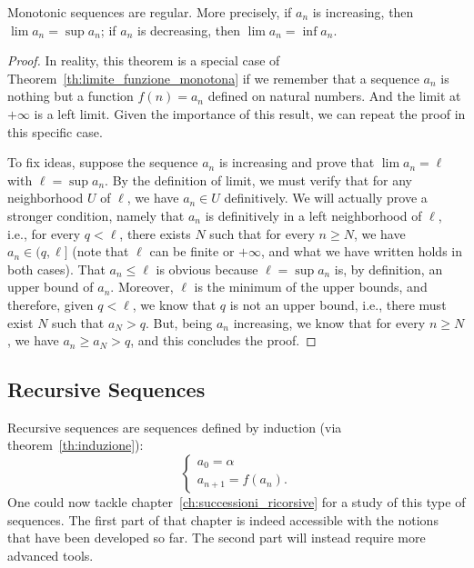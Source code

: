 \begin{theorem}
\label{th:limite_successione_monotona}%
Monotonic sequences are regular.
More precisely, if $a_n$ is increasing, then $\lim a_n = \sup a_n$; 
if $a_n$ is decreasing, then $\lim a_n = \inf a_n$.
\end{theorem}
\begin{proof}
In reality, this theorem is a special case of 
Theorem~\ref{th:limite_funzione_monotona} if we remember that a sequence 
$a_n$ is nothing but a function $f(n)=a_n$ defined on natural numbers.
And the limit at $+\infty$ is a left limit.
Given the importance of this result, we can repeat the proof 
in this specific case.

To fix ideas, suppose the sequence $a_n$ is increasing and prove 
that $\lim a_n = \ell$ with $\ell=\sup a_n$.
By the definition of limit, we must verify that for any neighborhood $U$ 
of $\ell$, we have $a_n\in U$ definitively.
We will actually prove a stronger condition, namely that $a_n$ is definitively 
in a left neighborhood of $\ell$, i.e., for every $q<\ell$, there exists $N$
such that
for every $n\ge N$, we have $a_n\in (q,\ell]$ (note that $\ell$ can be finite or
$+\infty$,
and what we have written holds in both cases).
That $a_n\le \ell$ is obvious because $\ell=\sup a_n$ is, by definition, an
upper bound
of $a_n$. Moreover, $\ell$ is the minimum of the upper bounds, and therefore,
given
$q<\ell$, we know that $q$ is not an upper bound, i.e., there must exist $N$
such that
$a_N > q$. But, being $a_n$ increasing, we know that for every $n\ge N$, we have
$a_n \ge a_N >q$, and this concludes the proof.
\end{proof}


\subsection{Recursive Sequences}

Recursive sequences are sequences
defined by induction (via theorem~\ref{th:induzione}):
\[
 \begin{cases}
   a_0 = \alpha \\
   a_{n+1} = f(a_n).
 \end{cases}
\]
One could now tackle chapter~\ref{ch:successioni_ricorsive}
for a study of this type of sequences.
The first part of that chapter is indeed accessible with the notions
that have been developed so far.
The second part will instead require more advanced tools.

